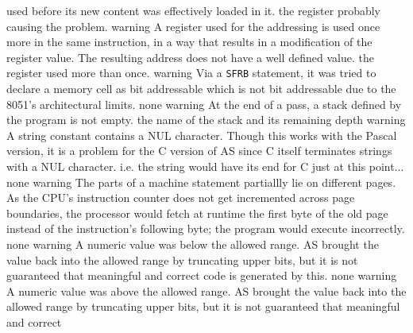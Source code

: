 \documentclass[12pt,twoside]{report}
\newcommand{\tty}[1]{{\tt #1}}
\newcommand{\asname}{{AS}}
\begin{document}
\begin{description}
{                used before its new content was effectively loaded in it.}
               {the register probably causing the problem.}
               {warning}
               {A register used for the addressing is used once more in the
                same instruction, in a way that results in a modification
                of the register value. The resulting address does not have a
                well defined value.}
               {the register used more than once.}
               {warning}
               {Via a \tty{SFRB} statement, it was tried to declare a memory cell
                as bit addressable which is not bit addressable due to the
                8051's architectural limits.}
               {none}
               {warning}
               {At the end of a pass, a stack defined by the program is
                not empty.}
               {the name of the stack and its remaining depth}
               {warning}
               {A string constant contains a NUL character. Though this
                works with the Pascal version, it is a problem for the
                C version of \asname{} since C itself terminates strings with
                a NUL character. i.e. the string would have its end for
                C just at this point...}
               {none}
               {warning}
               {The parts of a machine statement partiallly lie on
                different pages.  As the CPU's instruction counter does
                not get incremented across page boundaries, the processor
                would fetch at runtime the first byte of the old page
                instead of the instruction's following byte; the program
                would execute incorrectly.}
               {none}
               {warning}
               {A numeric value was below the allowed range.  \asname{} brought
                the value back into the allowed range by truncating upper
                bits, but it is not guaranteed that meaningful and correct
                code is generated by this.}
               {none}
               {warning}
               {A numeric value was above the allowed range.  \asname{} brought
                the value back into the allowed range by truncating upper
                bits, but it is not guaranteed that meaningful and correct
}
\end{description}
\end{document}
